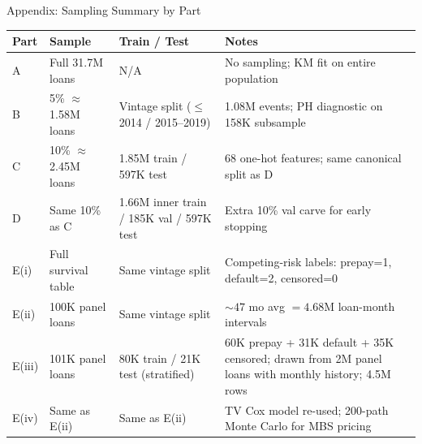 \documentclass[10pt,aspectratio=169]{beamer}
\begin{document}
\begin{frame}{Appendix: Sampling Summary by Part}
    \small
    \begin{tabular}{p{1.0cm}p{3.2cm}p{3.2cm}p{5.0cm}}
        \toprule
        \textbf{Part} & \textbf{Sample} & \textbf{Train / Test} & \textbf{Notes} \\
        \midrule
        A
          & Full 31.7M loans
          & N/A
          & No sampling; KM fit on entire population \\[4pt]
        B
          & 5\% $\approx$ 1.58M loans
          & Vintage split ($\leq$2014 / 2015--2019)
          & 1.08M events; PH diagnostic on 158K subsample \\[4pt]
        C
          & 10\% $\approx$ 2.45M loans
          & 1.85M train / 597K test
          & 68 one-hot features; same canonical split as D \\[4pt]
        D
          & Same 10\% as C
          & 1.66M inner train / 185K val / 597K test
          & Extra 10\% val carve for early stopping \\[4pt]
        E(i)
          & Full survival table
          & Same vintage split
          & Competing-risk labels: prepay=1, default=2, censored=0 \\[4pt]
        E(ii)
          & 100K panel loans
          & Same vintage split
          & ${\sim}47$ mo avg $= 4.68$M loan-month intervals \\[4pt]
        E(iii)
          & 101K panel loans
          & 80K train / 21K test (stratified)
          & 60K prepay + 31K default + 35K censored; drawn from 2M panel loans with monthly history; 4.5M rows \\[4pt]
        E(iv)
          & Same as E(ii)
          & Same as E(ii)
          & TV Cox model re-used; 200-path Monte Carlo for MBS pricing \\
        \bottomrule
    \end{tabular}
\end{frame}
\end{document}
